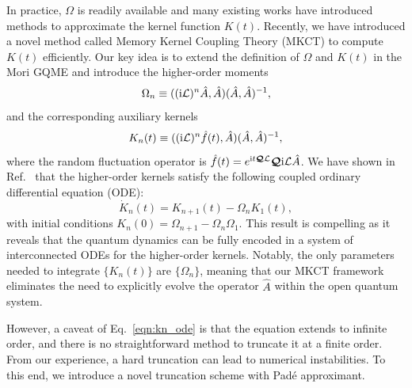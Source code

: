 \documentclass[preprint,aip,jcp]{revtex4-2}
\newcommand{\im}{\textup{i}}
\newcommand{\Lv}{\mathcal{L}}
\newcommand{\Qroj}{\bm{\mathcal{Q}}}
\begin{document}
In practice, $\Omega$ is readily available and many existing works have introduced methods to approximate the kernel function $K(t)$. \cite{kelly_generalized_2016, montoya-castillo_approximate_2016, yan_theoretical_2019} Recently, we have introduced a novel method called Memory Kernel Coupling Theory (MKCT) to compute $K(t)$ efficiently. \cite{liu2024mkct} Our key idea is to extend the definition of $\Omega$ and $K(t)$ in the Mori GQME and introduce the higher-order moments 
\begin{equation}\label{eqn:moments}
    \Omega_n \equiv ((\im\Lv)^n \hat{A}, \hat{A}) (\hat{A}, \hat{A})^{-1},
\end{equation}
and the corresponding auxiliary kernels
\begin{equation}\label{eqn:kernels}
    K_n(t) \equiv ((\im\Lv)^n \hat{f}(t), \hat{A}) (\hat{A}, \hat{A})^{-1},
\end{equation}
where the random fluctuation operator is $\hat{f}(t) = e^{\im t \Qroj\Lv} \Qroj \im\Lv\hat{A}$. 
We have shown in Ref.~\cite{liu2024mkct} that the higher-order kernels satisfy the following coupled ordinary differential equation (ODE): 
\begin{equation}\label{eqn:kn_ode}
    \dot{K}_n(t) = K_{n+1}(t) - \Omega_n K_1(t), 
\end{equation}
with initial conditions $K_{n}(0) = \Omega_{n+1} - \Omega_n \Omega_1$. This result is compelling as it reveals that the quantum dynamics can be fully encoded in a system of interconnected ODEs for the higher-order kernels. Notably, the only parameters needed to integrate $\{K_n(t)\}$ are $\{\Omega_n\}$, meaning that our MKCT framework eliminates the need to explicitly evolve the operator $\hat{A}$ within the open quantum system.

However, a caveat of Eq.~\ref{eqn:kn_ode} is that the equation extends to infinite order, and there is no straightforward method to truncate it at a finite order. From our experience, a hard truncation can lead to numerical instabilities. To this end, we introduce a novel truncation scheme with Pad\'{e} approximant.
\end{document}
